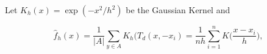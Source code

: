 Let  $K_h(x) = \exp( -x^2/h^2)$ be the Gaussian Kernel and

\[
    \hat{f}_h(x) = \frac{1}{|A|}\sum_{ y \in A} K_h (T_d(x, - x_i) = \frac{1}{nh} \sum_{i=1}^n K\Big(\frac{x-x_i}{h}\Big),
  \]